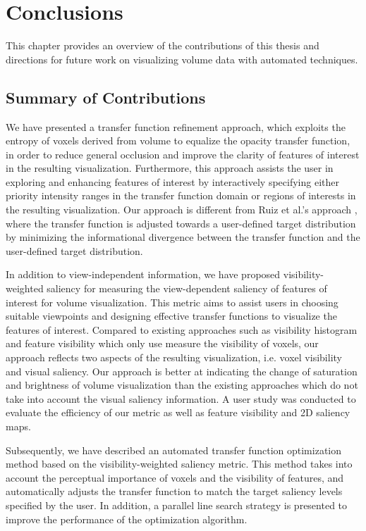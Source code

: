 \chapter{Conclusions \label{conclusions}}

This chapter provides an overview of the contributions of this thesis and directions for future work on visualizing volume data with automated techniques.

\section{Summary of Contributions}
We have presented a transfer function refinement approach, which exploits the entropy of voxels derived from volume to equalize the opacity transfer function, in order to reduce general occlusion and improve the clarity of features of interest in the resulting visualization.
Furthermore, this approach assists the user in exploring and enhancing features of interest by interactively specifying either priority intensity ranges in the transfer function domain or regions of interests in the resulting visualization.
Our approach is different from Ruiz et al.'s approach \cite{ruiz_automatic_2011}, where the transfer function is adjusted towards a user-defined target distribution by minimizing the informational divergence between the transfer function and the user-defined target distribution.

In addition to view-independent information, we have proposed visibility-weighted saliency for measuring the view-dependent saliency of features of interest for volume visualization.
This metric aims to assist users in choosing suitable viewpoints and designing effective transfer functions to visualize the features of interest.
Compared to existing approaches such as visibility histogram \cite{correa_visibility_2011} and feature visibility \cite{wang_efficient_2011} which only use measure the visibility of voxels, our approach reflects two aspects of the resulting visualization, i.e. voxel visibility and visual saliency. Our approach is better at indicating the change of saturation and brightness of volume visualization than the existing approaches which do not take into account the visual saliency information. A user study was conducted to evaluate the efficiency of our metric as well as feature visibility and 2D saliency maps.

Subsequently, we have described an automated transfer function optimization method based on the visibility-weighted saliency metric. This method takes into account the perceptual importance of voxels and the visibility of features, and automatically adjusts the transfer function to match the target saliency levels specified by the user. In addition, a parallel line search strategy is presented to improve the performance of the optimization algorithm.

